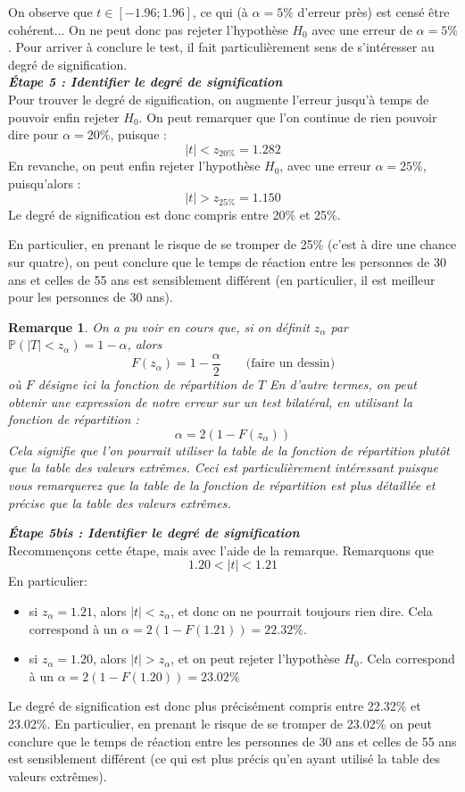 \documentclass[a4paper,oneside,12pt]{article}
\theoremstyle{plain}
\newtheorem*{remark}{Remarque}
\def\P{{\mathbb P}}
\begin{document}
On observe que $t\in [-1.96;1.96]$, ce qui (à $\alpha = 5\%$ d'erreur près) est censé être cohérent... On ne peut donc pas rejeter l'hypothèse $H_0$ avec une erreur de $\alpha = 5\%$. Pour arriver à conclure le test, il fait particulièrement sens de s'intéresser au degré de signification.\\
    
\textit{\textbf{Étape 5 : Identifier le degré de signification}}\\
Pour trouver le degré de signification, on augmente l'erreur jusqu'à temps de pouvoir enfin rejeter $H_0$. On peut remarquer que l'on continue de rien pouvoir dire pour $\alpha = 20\%$, puisque :
$$|t|< z_{20\%} = 1.282$$
En revanche, on peut enfin rejeter l'hypothèse $H_0$, avec une erreur $\alpha = 25\%$, puisqu'alors :
$$|t|> z_{25\%} = 1.150$$
Le degré de signification est donc compris entre 20\% et 25\%. 
    
En particulier, en prenant le risque de se tromper de 25\% (c'est à dire une chance sur quatre), on peut conclure que le temps de réaction entre les personnes de 30 ans et celles de 55 ans est sensiblement différent (en particulier, il est meilleur pour les personnes de 30 ans).

\begin{remark}
On a pu voir en cours que, si on définit $z_\alpha$ par $ \P(|T|<z_\alpha) = 1-\alpha$, alors 
$$ F(z_{\alpha}) =  1-\frac{\alpha}{2}\qquad \mbox{(faire un dessin)}$$
où $F$ désigne ici la fonction de répartition de $T$
En d'autre termes, on peut obtenir une expression de notre erreur sur un test bilatéral, en utilisant la fonction de répartition :
$$\alpha = 2(1-F(z_{\alpha}))$$
Cela signifie que l'on pourrait utiliser la table de la fonction de répartition plutôt que la table des valeurs extrêmes. Ceci est particulièrement intéressant puisque vous remarquerez que la table de la fonction de répartition est plus détaillée et précise que la table des valeurs extrêmes.
\end{remark}

\textit{\textbf{Étape 5bis : Identifier le degré de signification}}\\
Recommençons cette étape, mais avec l'aide de la remarque. Remarquons que $$1.20<|t|<1.21$$
En particulier:
\begin{itemize}
    \item si $z_\alpha = 1.21$, alors $|t|<z_\alpha$, et donc on ne pourrait toujours rien dire. Cela correspond à un $\alpha = 2(1-F(1.21)) = 22.32\%$.
    \item si  $z_\alpha = 1.20$, alors $|t|>z_\alpha$, et on peut rejeter l'hypothèse $H_0$. Cela correspond à un $\alpha = 2(1-F(1.20)) = 23.02\%$
\end{itemize}
Le degré de signification est donc plus précisément compris entre 22.32\% et 23.02\%. En particulier, en prenant le risque de se tromper de 23.02\% on peut conclure que le temps de réaction entre les personnes de 30 ans et celles de 55
ans est sensiblement différent (ce qui est plus précis qu'en ayant utilisé la table des valeurs extrêmes).
\end{document}
